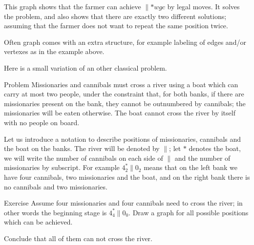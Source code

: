 \begin{center}
\end{center}

This graph shows that the farmer can achieve ${}{\parallel}{{*}wgc}$ by legal moves.
It solves the problem, and also shows that there are exactly two different solutions;
assuming that the farmer does not want to repeat the same position twice. 
\qeds

Often graph comes with an extra structure, for example labeling of edges and/or vertexes as in the example above.

Here is a small variation of an other classical problem.

\begin{thm}{Problem} Missionaries and cannibals must cross a river using a boat which can carry at most two people, under the constraint that, for both banks, if there are missionaries present on the bank, they cannot be outnumbered by cannibals; the missionaries will be eaten otherwise.
The boat cannot cross the river by itself with no people on board.
\end{thm}

Let us introduce a notation to describe positions of missionaries, cannibals and the boat on the banks.
The river will be denoted by ${\parallel}$;
let $*$ denotes the boat, we will write the number of cannibals on each side of ${\parallel}$ and the number of missionaries by subscript. 
For example $4_2^*{\parallel}0_2$ means that on the left bank we have four cannibals, two missionaries and the boat, and on the right bank there is no cannibals and two missionaries.

\begin{thm}{Exercise}
Assume four missionaries and four cannibals need to cross the river; in other words the beginning stage is $4_4^*{\parallel}0_0$.
Draw a graph for all possible positions which can be achieved.

Conclude that all of them can not cross the river.
\end{thm}
